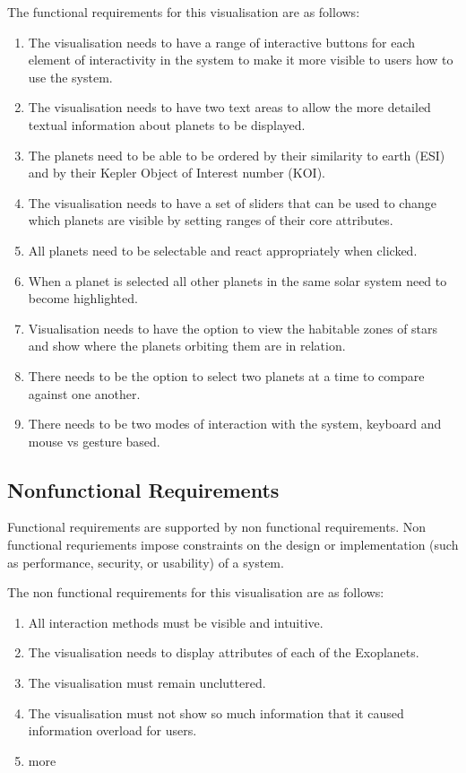 The functional requirements for this visualisation are as follows:
\begin{enumerate}
 \item The visualisation needs to have a range of interactive buttons for each element of interactivity in the system to make it more visible to users how to use the system.
 \item The visualisation needs to have two text areas to allow the more detailed textual information about planets to be displayed.
 \item The planets need to be able to be ordered by their similarity to earth (ESI) and by their Kepler Object of Interest number (KOI).
 \item The visualisation needs to have a set of sliders that can be used to change which planets are visible by setting ranges of their core attributes.
 \item All planets need to be selectable and react appropriately when clicked.
 \item When a planet is selected all other planets in the same solar system need to become highlighted.
 \item Visualisation needs to have the option to view the habitable zones of stars and show where the planets orbiting them are in relation.
 \item There needs to be the option to select two planets at a time to compare against one another.
 \item There needs to be two modes of interaction with the system, keyboard and mouse vs gesture based.
\end{enumerate}


\subsection{Nonfunctional Requirements}
 Functional requirements are supported by non functional requirements. Non functional requriements impose constraints on the design or implementation (such as performance, security, or usability) of a system.
 
 The non functional requirements for this visualisation are as follows:
\begin{enumerate}
 \item All interaction methods must be visible and intuitive.
 \item The visualisation needs to display attributes of each of the Exoplanets.
 \item The visualisation must remain uncluttered.
 \item The visualisation must not show so much information that it caused information overload for users.
\item more
\end{enumerate}
 
